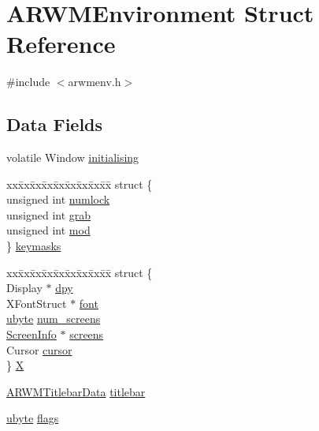 \hypertarget{struct_a_r_w_m_environment}{
\section{ARWMEnvironment Struct Reference}
\label{struct_a_r_w_m_environment}
}


{\ttfamily \#include $<$arwmenv.h$>$}

\subsection*{Data Fields}
\begin{DoxyCompactItemize}
\item 
volatile Window \hyperlink{struct_a_r_w_m_environment_a27b4b32fd226f6f68ca8d232fea6b0f2}{initialising}
\item 
\begin{tabbing}
xx\=xx\=xx\=xx\=xx\=xx\=xx\=xx\=xx\=\kill
struct \{\\
\>unsigned int \hyperlink{struct_a_r_w_m_environment_ae224c1b4a34d4250337c9f98f11bbc19}{numlock}\\
\>unsigned int \hyperlink{struct_a_r_w_m_environment_a863757047914bfab4f2977df6a49af4a}{grab}\\
\>unsigned int \hyperlink{struct_a_r_w_m_environment_a0129323c18765fa1130f63453ee3b804}{mod}\\
\} \hyperlink{struct_a_r_w_m_environment_aa2d0dbccd430e7644e3665d8ae005eb2}{keymasks}\\

\end{tabbing}\item 
\begin{tabbing}
xx\=xx\=xx\=xx\=xx\=xx\=xx\=xx\=xx\=\kill
struct \{\\
\>Display $\ast$ \hyperlink{struct_a_r_w_m_environment_a7d43b3edf58f8d85a89852ab95b740f6}{dpy}\\
\>XFontStruct $\ast$ \hyperlink{struct_a_r_w_m_environment_a2339fdaf39b53e1d4619fe087759f80a}{font}\\
\>\hyperlink{arwm_8h_a5dd4f281954ce1405c92d62a427f839a}{ubyte} \hyperlink{struct_a_r_w_m_environment_a2e9f78bf4773f32edd24e844e79ed216}{num\_screens}\\
\>\hyperlink{struct_screen_info}{ScreenInfo} $\ast$ \hyperlink{struct_a_r_w_m_environment_afa064ef94c863dff48200952ffb4b3b7}{screens}\\
\>Cursor \hyperlink{struct_a_r_w_m_environment_a7a12555ff8c0a52bed4956969fd82d88}{cursor}\\
\} \hyperlink{struct_a_r_w_m_environment_ae528833f8e635aa8254dab1c00b1e1c1}{X}\\

\end{tabbing}\item 
\hyperlink{struct___a_r_w_m_titlebar_data}{ARWMTitlebarData} \hyperlink{struct_a_r_w_m_environment_af924e7310bb0b594a441bb7f7f99bc6b}{titlebar}
\item 
\hyperlink{arwm_8h_a5dd4f281954ce1405c92d62a427f839a}{ubyte} \hyperlink{struct_a_r_w_m_environment_a6fe1f727acb55f187efc1261f60004f8}{flags}
\end{DoxyCompactItemize}


